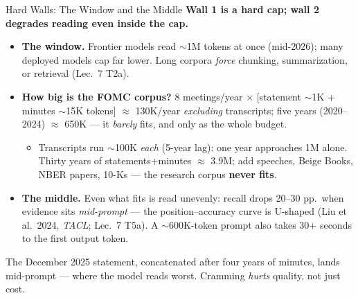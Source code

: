 \begin{frame}{Hard Walls: The Window and the Middle}
\textbf{Wall 1 is a hard cap; wall 2 degrades reading even inside the cap.}

\smallskip
\begin{itemize}
\item \textbf{The window.} Frontier models read $\sim$1M tokens at once (mid-2026); many deployed models cap far lower. Long corpora \emph{force} chunking, summarization, or retrieval (Lec.\ 7 T2a).

\smallskip
\item \textbf{How big is the FOMC corpus?} 8 meetings/year $\times$ [statement $\sim$1K + minutes $\sim$15K tokens] $\approx$ 130K/year \emph{excluding} transcripts; five years (2020--2024) $\approx$ 650K --- it \emph{barely} fits, and only as the whole budget.
\begin{itemize}
    \item Transcripts run $\sim$100K \emph{each} (5-year lag): one year approaches 1M alone. Thirty years of statements+minutes $\approx$ 3.9M; add speeches, Beige Books, NBER papers, 10-Ks --- the research corpus \textbf{never fits}.
\end{itemize}

\smallskip
\item \textbf{The middle.} Even what fits is read unevenly: recall drops 20--30 pp.\ when evidence sits \emph{mid-prompt} --- the position--accuracy curve is U-shaped (Liu et al.\ 2024, \emph{TACL}; Lec.\ 7 T5a). A $\sim$600K-token prompt also takes 30+ seconds to the first output token.
\end{itemize}

\smallskip
\begin{cautionbox}
The December 2025 statement, concatenated after four years of minutes, lands mid-prompt --- where the model reads worst. Cramming \emph{hurts} quality, not just cost.
\end{cautionbox}
\end{frame}

